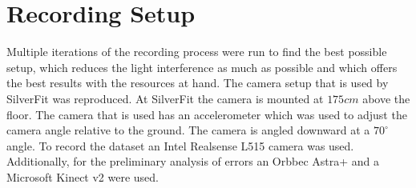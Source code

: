 \section{Recording Setup}

Multiple iterations of the recording process were run to find the best possible setup, which reduces the light interference as much as possible and which offers the best results with the resources at hand. The camera setup that is used by SilverFit was reproduced. At SilverFit the camera is mounted at $175cm$ above the floor. The camera that is used has an accelerometer which was used to adjust the camera angle relative to the ground. The camera is angled downward at a $70^\circ$ angle. To record the dataset an Intel Realsense L515 camera was used. Additionally, for the preliminary analysis of errors an Orbbec Astra+ and a Microsoft Kinect v2 were used.
